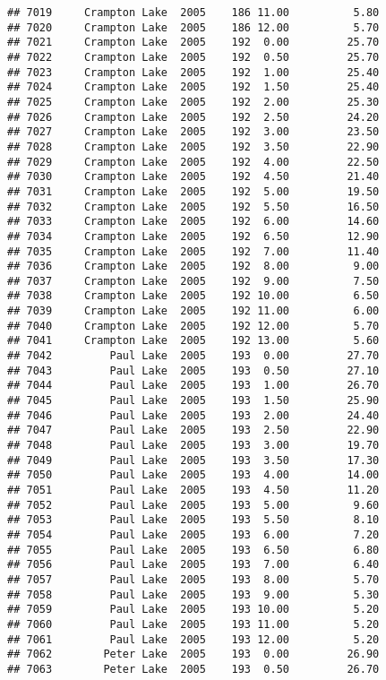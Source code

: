 \documentclass[
]{article}
\begin{document}
\begin{verbatim}
## 7019     Crampton Lake  2005    186 11.00          5.80
## 7020     Crampton Lake  2005    186 12.00          5.70
## 7021     Crampton Lake  2005    192  0.00         25.70
## 7022     Crampton Lake  2005    192  0.50         25.70
## 7023     Crampton Lake  2005    192  1.00         25.40
## 7024     Crampton Lake  2005    192  1.50         25.40
## 7025     Crampton Lake  2005    192  2.00         25.30
## 7026     Crampton Lake  2005    192  2.50         24.20
## 7027     Crampton Lake  2005    192  3.00         23.50
## 7028     Crampton Lake  2005    192  3.50         22.90
## 7029     Crampton Lake  2005    192  4.00         22.50
## 7030     Crampton Lake  2005    192  4.50         21.40
## 7031     Crampton Lake  2005    192  5.00         19.50
## 7032     Crampton Lake  2005    192  5.50         16.50
## 7033     Crampton Lake  2005    192  6.00         14.60
## 7034     Crampton Lake  2005    192  6.50         12.90
## 7035     Crampton Lake  2005    192  7.00         11.40
## 7036     Crampton Lake  2005    192  8.00          9.00
## 7037     Crampton Lake  2005    192  9.00          7.50
## 7038     Crampton Lake  2005    192 10.00          6.50
## 7039     Crampton Lake  2005    192 11.00          6.00
## 7040     Crampton Lake  2005    192 12.00          5.70
## 7041     Crampton Lake  2005    192 13.00          5.60
## 7042         Paul Lake  2005    193  0.00         27.70
## 7043         Paul Lake  2005    193  0.50         27.10
## 7044         Paul Lake  2005    193  1.00         26.70
## 7045         Paul Lake  2005    193  1.50         25.90
## 7046         Paul Lake  2005    193  2.00         24.40
## 7047         Paul Lake  2005    193  2.50         22.90
## 7048         Paul Lake  2005    193  3.00         19.70
## 7049         Paul Lake  2005    193  3.50         17.30
## 7050         Paul Lake  2005    193  4.00         14.00
## 7051         Paul Lake  2005    193  4.50         11.20
## 7052         Paul Lake  2005    193  5.00          9.60
## 7053         Paul Lake  2005    193  5.50          8.10
## 7054         Paul Lake  2005    193  6.00          7.20
## 7055         Paul Lake  2005    193  6.50          6.80
## 7056         Paul Lake  2005    193  7.00          6.40
## 7057         Paul Lake  2005    193  8.00          5.70
## 7058         Paul Lake  2005    193  9.00          5.30
## 7059         Paul Lake  2005    193 10.00          5.20
## 7060         Paul Lake  2005    193 11.00          5.20
## 7061         Paul Lake  2005    193 12.00          5.20
## 7062        Peter Lake  2005    193  0.00         26.90
## 7063        Peter Lake  2005    193  0.50         26.70

\end{verbatim}
\end{document}
